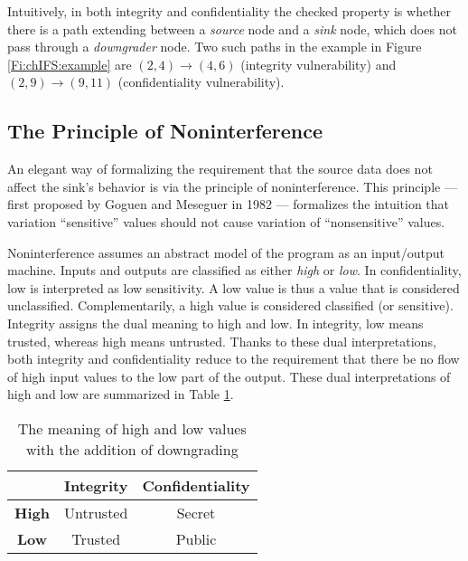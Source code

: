 Intuitively, in both integrity and confidentiality the checked property is whether there is a path extending between a \emph{source} node and a \emph{sink} node, which does not pass through a \emph{downgrader} node. Two such paths in the example in Figure \ref{Fi:chIFS:example} are $(2,4) \longrightarrow (4,6)$ (integrity vulnerability) and  
$(2,9) \longrightarrow (9,11)$ (confidentiality vulnerability). 

\subsection{The Principle of Noninterference}

An elegant way of formalizing the requirement that the source data does not affect the sink's behavior is via the principle of noninterference. This principle --- first proposed by Goguen and Meseguer in 1982 \cite{GoguenMeseguer} --- formalizes the intuition that variation ``sensitive'' values should not cause variation of ``nonsensitive'' values.

Noninterference assumes an abstract model of the program as an input/output machine. Inputs and outputs are classified as either \emph{high} or \emph{low}.
%
In confidentiality, low is interpreted as low sensitivity. A low value is thus a value that is considered unclassified. Complementarily, a high value is considered classified (or sensitive). Integrity assigns the dual meaning to high and low. 
In integrity, low means trusted, whereas high means untrusted. Thanks to these dual interpretations, both integrity and confidentiality reduce to the requirement that there be no flow of high input values to the low part of the output.
%
These dual interpretations of high and low are summarized in Table \ref{Ta:highlow}.

\begin{table}
	\begin{center}
		\begin{tabular}{|c|c|c|}
			\hline
					& {\bf Integrity} & {\bf Confidentiality} \\ \hline
			{\bf High}	& Untrusted & Secret \\ \hline
			{\bf Low} & Trusted & Public \\ 		
			\hline
		\end{tabular}
	\end{center}
		\caption{\label{Ta:highlow}The meaning of high and low values with the addition of downgrading}
\end{table} 

